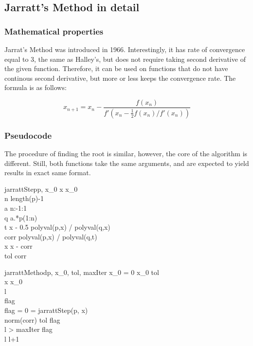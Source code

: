 \documentclass{article}
\begin{document}
\subsection{Jarratt's Method in detail}

\subsubsection{Mathematical properties}

Jarrat's Method was introduced in 1966. Interestingly, it has rate of convergence equal to 3, the
same as Halley's, but does not require taking second derivative of the given function. Therefore, it
can be used on functions that do not have continous second derivative, but more or less keeps the
convergence rate. The formula is as follows:

\[ x_{n+1} = x_n - \frac{f(x_n)}{f'( x_n-\frac{1}{2}f(x_n)/f'(x_n) )} \]

\subsubsection{Pseudocode}

The procedure of finding the root is similar, however, the core of the algorithm is different.
Still, both functions take the same arguments, and are expected to yield results in exact same
format.

\begin{pseudocode}{jarrattStep}{p, x_0}
	x \gets x_0 \\
	n \gets length(p)-1 \\
	a \gets n:-1:1 \\
	q \gets a.*p(1:n) \\
	t \gets x - 0.5 \times polyval(p,x) / polyval(q,x) \\
	corr \gets polyval(p,x) / polyval(q,t) \\
	x \gets x - corr \\
	tol \gets corr \\
\end{pseudocode}

\begin{pseudocode}{jarrattMethod}{p, x_0, tol, maxIter}
	\IF x_0 = 0 \THEN
		x_0 \gets tol \\
	x \gets x_0 \\
	l  \\
	flag \\
	\WHILE flag = 0 \DO
	\BEGIN
		 = jarrattStep(p, x) \\
		\IF norm(corr) \leq tol \THEN
			flag  \\
		\IF l > maxIter \THEN
			flag  \\
		l \gets l+1 \\
	\END \\
\end{pseudocode}
\end{document}
